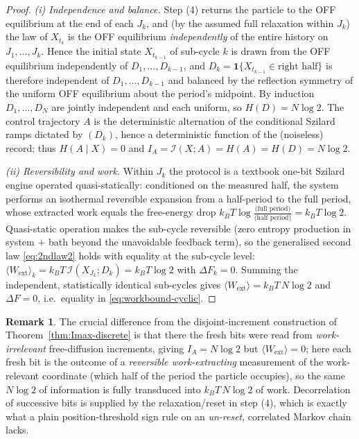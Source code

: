 \documentclass{amsart}
\theoremstyle{definition}
\newtheorem{remark}{Remark}
\newcommand{\kB}{k_{B}}
\newcommand{\Wext}{\langle W_{\mathrm{ext}}\rangle}
\begin{document}
\begin{proof}
\emph{(i) Independence and balance.} Step (4) returns the particle to the OFF
equilibrium at the end of each $J_k$, and (by the assumed full relaxation
within $J_k$) the law of $X_{t_k}$ is the OFF equilibrium \emph{independently}
of the entire history on $J_1,\dots,J_k$. Hence the initial state $X_{t_{k-1}}$
of sub-cycle $k$ is drawn from the OFF equilibrium independently of
$D_1,\dots,D_{k-1}$, and $D_k=\mathbf 1\{X_{t_{k-1}}\in\text{right half}\}$ is
therefore independent of $D_1,\dots,D_{k-1}$ and balanced by the reflection
symmetry of the uniform OFF equilibrium about the period's midpoint. By
induction $D_1,\dots,D_N$ are jointly independent and each uniform, so
$H(D)=N\log2$. The control trajectory $A$ is the deterministic alternation of
the conditional Szilard ramps dictated by $(D_k)$, hence a deterministic
function of the (noiseless) record; thus $H(A\mid X)=0$ and
$I_A=\mathcal I(X;A)=H(A)=H(D)=N\log2$.

\emph{(ii) Reversibility and work.} Within $J_k$ the protocol is a textbook
one-bit Szilard engine operated quasi-statically: conditioned on the measured
half, the system performs an isothermal reversible expansion from a
half-period to the full period, whose extracted work equals the free-energy
drop $\kB T\log\!\frac{\text{(full period)}}{\text{(half period)}}=\kB T\log2$.
Quasi-static operation makes the sub-cycle reversible (zero entropy
production in system $+$ bath beyond the unavoidable feedback term), so the
generalised second law \eqref{eq:2ndlaw2} holds with equality at the
sub-cycle level: $\langle W_{\mathrm{ext}}\rangle_k=\kB T\,\mathcal
I(X_{J_k};D_k)=\kB T\log2$ with $\Delta F_k=0$. Summing the independent,
statistically identical sub-cycles gives $\Wext=\kB T\,N\log2$ and
$\Delta F=0$, i.e.\ equality in \eqref{eq:workbound-cyclic}.
\end{proof}

\begin{remark}
The crucial difference from the disjoint-increment construction of
Theorem~\ref{thm:Imax-discrete} is that there the fresh bits were read from
\emph{work-irrelevant} free-diffusion increments, giving $I_A=N\log2$ but
$\Wext=0$; here each fresh bit is the outcome of a \emph{reversible
work-extracting} measurement of the work-relevant coordinate (which half of the
period the particle occupies), so the same $N\log2$ of information is fully
transduced into $\kB T\,N\log2$ of work. Decorrelation of successive bits is
supplied by the relaxation/reset in step (4), which is exactly what a plain
position-threshold sign rule on an \emph{un-reset}, correlated Markov chain
lacks.
\end{remark}
\end{document}
